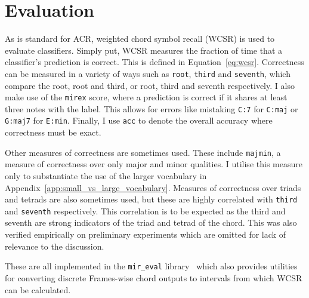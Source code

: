 


\section{Evaluation}\label{sec:evaluation}

As is standard for ACR, weighted chord symbol recall (WCSR) is used to evaluate classifiers. Simply put, WCSR measures the fraction of time that a classifier's prediction is correct. This is defined in Equation~\ref{eq:wcsr}. Correctness can be measured in a variety of ways such as \texttt{root}, \texttt{third} and \texttt{seventh}, which compare the root, root and third, or root, third and seventh respectively. I also make use of the \texttt{mirex} score, where a prediction is correct if it shares at least three notes with the label. This allows for errors like mistaking \texttt{C:7} for \texttt{C:maj} or \texttt{G:maj7} for \texttt{E:min}. Finally, I use \texttt{acc} to denote the overall accuracy where correctness must be exact.

Other measures of correctness are sometimes used. These include \texttt{majmin}, a measure of correctness over only major and minor qualities. I utilise this measure only to substantiate the use of the larger vocabulary in Appendix~\ref{app:small_vs_large_vocabulary}. Measures of correctness over triads and tetrads are also sometimes used, but these are highly correlated with \texttt{third} and \texttt{seventh} respectively. This correlation is to be expected as the third and seventh are strong indicators of the triad and tetrad of the chord. This was also verified empirically on preliminary experiments which are omitted for lack of relevance to the discussion.

These are all implemented in the \texttt{mir\_eval} library~\citep{mir_eval} which also provides utilities for converting discrete Frames-wise chord outputs to intervals from which WCSR can be calculated.

